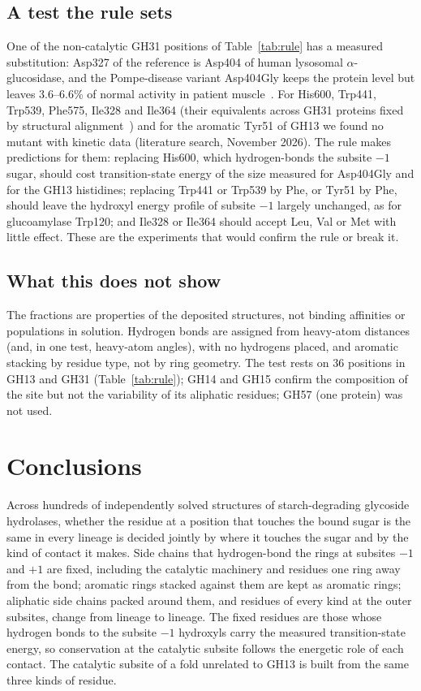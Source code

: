 \documentclass[preprint,12pt]{elsarticle}
\begin{document}
\subsection{A test the rule sets}
One of the non-catalytic GH31 positions of
Table~\ref{tab:rule} has a measured substitution: Asp327 of the reference is Asp404 of
human lysosomal $\alpha$-glucosidase, and the Pompe-disease variant Asp404Gly keeps the
protein level but leaves 3.6--6.6\% of normal activity in patient muscle~\citep{Nilsson2014}.
For His600, Trp441, Trp539, Phe575, Ile328 and Ile364 (their equivalents across GH31 proteins
fixed by structural alignment~\citep{Tan2010}) and for the aromatic Tyr51 of GH13 we found no mutant with
kinetic data (literature search, November 2026). The rule makes predictions for them:
replacing His600, which hydrogen-bonds the subsite $-1$ sugar, should cost transition-state
energy of the size measured for Asp404Gly and for the GH13 histidines; replacing Trp441 or Trp539 by Phe, or Tyr51 by Phe, should leave the hydroxyl
energy profile of subsite $-1$ largely unchanged, as for glucoamylase Trp120; and Ile328 or
Ile364 should accept Leu, Val or Met with little effect. These are the experiments that
would confirm the rule or break it.

\subsection{What this does not show}
The fractions are properties of the deposited
structures, not binding affinities or populations in solution. Hydrogen bonds are assigned
from heavy-atom distances (and, in one test, heavy-atom angles), with no hydrogens placed, and aromatic stacking by residue type, not by ring geometry. The test
rests on 36 positions in GH13 and GH31 (Table~\ref{tab:rule}); GH14 and GH15 confirm the composition of the
site but not the variability of its aliphatic residues; GH57 (one protein) was not used.

\section{Conclusions}

Across hundreds of independently solved structures of starch-degrading glycoside
hydrolases, whether the residue at a position that touches the bound sugar is the same in
every lineage is decided jointly by where it touches the sugar and by the kind of contact it
makes. Side chains that hydrogen-bond the rings at subsites $-1$ and $+1$ are fixed,
including the catalytic machinery and residues one ring away from the bond; aromatic rings
stacked against them are kept as aromatic rings; aliphatic side chains packed around them,
and residues of every kind at the outer subsites, change from lineage to lineage. The fixed residues are those whose hydrogen bonds to
the subsite $-1$ hydroxyls carry the measured transition-state energy, so conservation at
the catalytic subsite follows the energetic role of each contact. The catalytic subsite of
a fold unrelated to GH13 is built from the same three kinds of residue.
\end{document}
